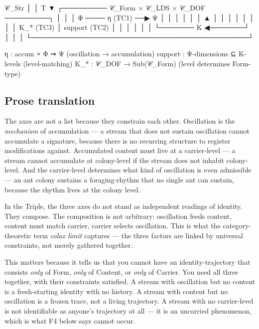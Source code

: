 \documentclass[11pt, openany]{book}
\begin{document}
\begin{Code}
                         𝒞_Str
                          │
                          │ T
                          ▼
       ┌───────── 𝒞_Form × 𝒞_LDS × 𝒞_DOF ─────────┐
       │                                            │
       │    Φ ──── η (TC1) ──▶ Ψ                    │
       │    │                  │                    │
       │    ▲                  │                    │
       │    │                  │                    │
       │    │ Κ_* (TC3)        │ support (TC2)      │
       │    │                  │                    │
       │    └─────── Κ ◀───────┘                    │
       │                                            │
       └────────────────────────────────────────────┘

η  : accum ∘ Φ ⇒ Ψ                    (oscillation → accumulation)
support : Ψ-dimensions ⊆ Κ-levels     (level-matching)
Κ_*  : 𝒞_DOF → Sub(𝒞_Form)             (level determines Form-type)
\end{Code}

\subsection{Prose translation}

The axes are not a list because they constrain each other. Oscillation is the \textit{mechanism} of accumulation --- a stream that does not sustain oscillation cannot accumulate a signature, because there is no recurring structure to register modifications against. Accumulated content must live at a carrier-level --- a stream cannot accumulate at colony-level if the stream does not inhabit colony-level. And the carrier-level determines what kind of oscillation is even admissible --- an ant colony sustains a foraging-rhythm that no single ant can sustain, because the rhythm lives at the colony level.

In the Triple, the three axes do not stand as independent readings of identity. They compose. The composition is not arbitrary: oscillation feeds content, content must match carrier, carrier selects oscillation. This is what the category-theoretic term \textit{colax limit} captures --- the three factors are linked by universal constraints, not merely gathered together.

This matters because it tells us that you cannot have an identity-trajectory that consists \textit{only} of Form, \textit{only} of Content, or \textit{only} of Carrier. You need all three together, with their constraints satisfied. A stream with oscillation but no content is a fresh-starting identity with no history. A stream with content but no oscillation is a frozen trace, not a living trajectory. A stream with no carrier-level is not identifiable as anyone's trajectory at all --- it is an uncarried phenomenon, which is what F4 below says cannot occur.
\end{document}
